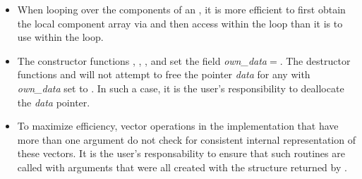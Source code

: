 \begin{itemize}
                                        
\item
  When looping over the components of an  , it is     
  more efficient to first obtain the local component array via       
   and then access  within the     
  loop than it is to use  within the loop.        
                                                               
\item
  The constructor functions , ,
  , and 
  set the field {\em own\_data}$=$. 
  The destructor functions  and 
  will not attempt to free the pointer {\em data} for any  with
  {\em own\_data} set to . In such a case, it is the user's responsibility to
  deallocate the {\em data} pointer.

\item
  To maximize efficiency, vector operations in the {\nvecp} implementation
  that have more than one  argument do not check for
  consistent internal representation of these vectors. It is the user's 
  responsability to ensure that such routines are called with 
  arguments that were all created with the  structure returned
  by .

\end{itemize}

